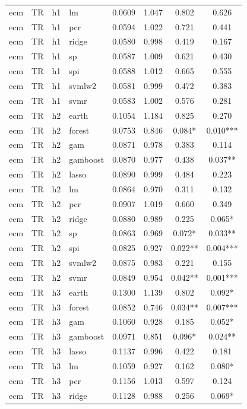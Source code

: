 \begin{ThreePartTable}
\begin{longtable}[t]{llclcccc}
ecm & TR & h1 & lm & 0.0609 & 1.047 & 0.802 & 0.626\\
ecm & TR & h1 & pcr & 0.0594 & 1.022 & 0.721 & 0.441\\
ecm & TR & h1 & ridge & 0.0580 & 0.998 & 0.419 & 0.167\\
ecm & TR & h1 & sp & 0.0587 & 1.009 & 0.621 & 0.430\\
ecm & TR & h1 & spi & 0.0588 & 1.012 & 0.665 & 0.555\\
ecm & TR & h1 & svmlw2 & 0.0581 & 0.999 & 0.472 & 0.383\\
ecm & TR & h1 & svmr & 0.0583 & 1.002 & 0.576 & 0.281\\
\addlinespace
ecm & TR & h2 & earth & 0.1054 & 1.184 & 0.825 & 0.270\\
ecm & TR & h2 & forest & 0.0753 & 0.846 & 0.084* & 0.010***\\
ecm & TR & h2 & gam & 0.0871 & 0.978 & 0.383 & 0.114\\
ecm & TR & h2 & gamboost & 0.0870 & 0.977 & 0.438 & 0.037**\\
ecm & TR & h2 & lasso & 0.0890 & 0.999 & 0.484 & 0.223\\
ecm & TR & h2 & lm & 0.0864 & 0.970 & 0.311 & 0.132\\
ecm & TR & h2 & pcr & 0.0907 & 1.019 & 0.660 & 0.349\\
ecm & TR & h2 & ridge & 0.0880 & 0.989 & 0.225 & 0.065*\\
ecm & TR & h2 & sp & 0.0863 & 0.969 & 0.072* & 0.033**\\
ecm & TR & h2 & spi & 0.0825 & 0.927 & 0.022** & 0.004***\\
ecm & TR & h2 & svmlw2 & 0.0875 & 0.983 & 0.221 & 0.155\\
ecm & TR & h2 & svmr & 0.0849 & 0.954 & 0.042** & 0.001***\\
\addlinespace
ecm & TR & h3 & earth & 0.1300 & 1.139 & 0.802 & 0.092*\\
ecm & TR & h3 & forest & 0.0852 & 0.746 & 0.034** & 0.007***\\
ecm & TR & h3 & gam & 0.1060 & 0.928 & 0.185 & 0.052*\\
ecm & TR & h3 & gamboost & 0.0971 & 0.851 & 0.096* & 0.024**\\
ecm & TR & h3 & lasso & 0.1137 & 0.996 & 0.422 & 0.181\\
ecm & TR & h3 & lm & 0.1059 & 0.927 & 0.162 & 0.080*\\
ecm & TR & h3 & pcr & 0.1156 & 1.013 & 0.597 & 0.124\\
ecm & TR & h3 & ridge & 0.1128 & 0.988 & 0.256 & 0.069*\\

\end{longtable}
\end{ThreePartTable}
